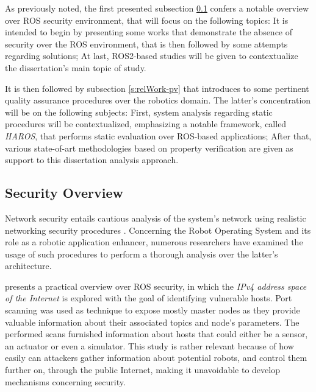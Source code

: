 As previously noted, the first presented subsection \ref{s:relWork-sec} confers a notable overview over ROS security environment, that will focus on the following topics: It is intended to begin by presenting some works that demonstrate the absence of security over the ROS environment, that is then followed by some attempts regarding solutions; At last, ROS2-based studies will be given to contextualize the dissertation's main topic of study. 

It is then followed by subsection \ref{s:relWork-pv} that introduces to some pertinent quality assurance procedures over the robotics domain. The latter's concentration will be on the following subjects: First, system analysis regarding static procedures will be contextualized, emphasizing a notable framework, called \textit{HAROS}, that performs static evaluation over ROS-based applications; After that, various state-of-art methodologies based on property verification are given as support to this dissertation analysis approach. 


\subsection{Security Overview}\label{s:relWork-sec}

Network security entails cautious analysis of the system's network using realistic networking security procedures \cite{marin2005network}. Concerning the Robot Operating System and its role as a robotic application enhancer, numerous researchers have examined the usage of such procedures to perform a thorough analysis over the latter's architecture.

\citeauthor*{8794451} presents a practical overview over ROS security, in which the \textit{IPv4 address space of the Internet} is explored with the goal of identifying vulnerable hosts. Port scanning was used as technique to expose mostly master nodes as they provide valuable information about their associated topics and node's parameters. The performed scans furnished information about hosts that could either be a sensor, an actuator or even a simulator. This study is rather relevant because of how easily can attackers gather information about potential robots, and control them further on, through the public Internet, making it unavoidable to develop mechanisms concerning security. 

